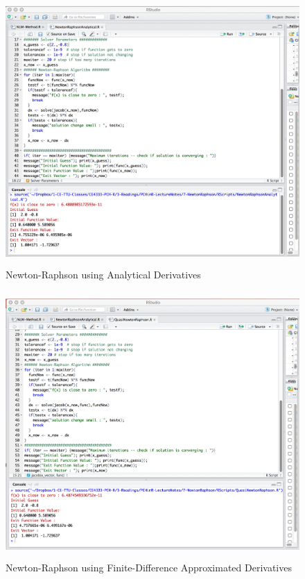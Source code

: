 \begin{figure}[h!] %
   \centering
   \includegraphics[height=4in]{./7-NewtonRaphson/NewtonRaphsonAnalytical.jpg} 
   \caption{Newton-Raphson using Analytical Derivatives}
   \label{fig:NewtonRaphsonAnalytical}
\end{figure}

\begin{figure}[h!] %
   \centering
   \includegraphics[height=4in]{./7-NewtonRaphson/NewtonRaphsonFiniteDiff.jpg} 
   \caption{Newton-Raphson using Finite-Difference Approximated Derivatives}
   \label{fig:NewtonRaphsonFiniteDiff}
\end{figure}

